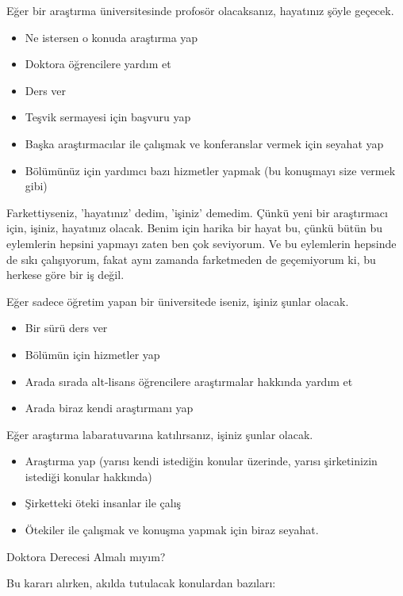 \documentclass[12pt,fleqn]{article}\usepackage{../../common}
\begin{document}
Eğer bir araştırma üniversitesinde profosör olacaksanız, hayatınız şöyle
geçecek.

\begin{itemize}
   \item Ne istersen o konuda araştırma yap
   \item Doktora öğrencilere yardım et
   \item Ders ver
   \item Teşvik sermayesi için başvuru yap
   \item Başka araştırmacılar ile çalışmak ve konferanslar vermek için
     seyahat yap
   \item Bölümünüz için yardımcı bazı hizmetler yapmak (bu konuşmayı size
     vermek gibi)
\end{itemize}

Farkettiyseniz, 'hayatınız' dedim, 'işiniz' demedim. Çünkü yeni bir
araştırmacı için, işiniz, hayatınız olacak. Benim için harika bir hayat bu,
çünkü bütün bu eylemlerin hepsini yapmayı zaten ben çok seviyorum. Ve bu
eylemlerin hepsinde de sıkı çalışıyorum, fakat aynı zamanda farketmeden de
geçemiyorum ki, bu herkese göre bir iş değil.

Eğer sadece öğretim yapan bir üniversitede iseniz, işiniz şunlar olacak.

\begin{itemize}
   \item Bir sürü ders ver
   \item Bölümün için hizmetler yap
   \item Arada sırada alt-lisans öğrencilere araştırmalar hakkında yardım et
   \item Arada biraz kendi araştırmanı yap
\end{itemize}

Eğer araştırma labaratuvarına katılırsanız, işiniz şunlar olacak.

\begin{itemize}
   \item Araştırma yap (yarısı kendi istediğin konular üzerinde, yarısı
     şirketinizin istediği konular hakkında)
   \item Şirketteki öteki insanlar ile çalış
   \item Ötekiler ile çalışmak ve konuşma yapmak için biraz seyahat.
\end{itemize}

Doktora Derecesi Almalı mıyım?

Bu kararı alırken, akılda tutulacak konulardan bazıları:
\end{document}
